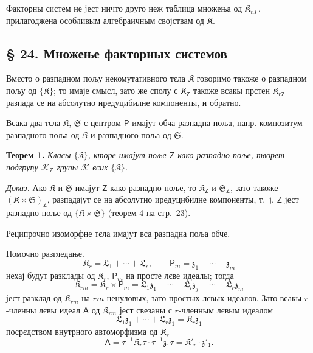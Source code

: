 \documentclass[11pt]{article}
\begin{document}
Факторны систем не јест ничто друго неж таблица множења од \(\mathfrak K_{n\Gamma}\), прилагоджена особливым алгебраичным својствам од \(\mathfrak K\).

\subsection*{§ 24. Множење факторных системов}\label{multiplikation-von-faktorensystemen}

Вмєсто о разпадном пољу некомутативного тєла \(\mathfrak K\) говоримо такоже о разпадном пољу од \(\{\mathfrak K\}\); то имаје смысл, зато же сполу с \(\mathfrak K_{\mathsf{Z}}\) такоже всакы прстен \(\mathfrak K_{r\mathsf{Z}}\) разпада се на абсолутно иредуцибилне компоненты, и обратно.

Всака два тєла \(\mathfrak K\), \(\mathfrak S\) с центром \(\mathsf P\) имајут обча разпадна поља, напр. композитум разпадного поља од \(\mathfrak K\) и разпадного поља од \(\mathfrak S\).

\textbf{Теорем 1.} \emph{Класы \(\{\mathfrak K\}\), кторе имајут поље \(\mathsf{Z}\) како разпадно поље, творет подгрупу \(\mathscr K_{\mathsf{Z}}\) групы \(\mathscr K\) всих \(\{\mathfrak K\}\).}

\emph{Доказ.} Ако \(\mathfrak K\) и \(\mathfrak S\) имајут \(\mathsf{Z}\) како разпадно поље, то \(\mathfrak K_{\mathsf{Z}}\) и \(\mathfrak S_{\mathsf{Z}}\), зато такоже \((\mathfrak K\times\mathfrak S)_{\mathsf{Z}}\), разпадајут се на абсолутно иредуцибилне компоненты, т.~ј. \(\mathsf{Z}\) јест разпадно поље од \(\{\mathfrak K\times\mathfrak S\}\) (теорем 4 на стр.~23).

Реципрочно изоморфне тєла имајут вса разпадна поља обче.

Помочно разгледање.
\[
\mathfrak K_r=\mathfrak L_1+\cdots+\mathfrak L_r,\qquad
\mathsf P_m=\mathfrak z_1+\cdots+\mathfrak z_m
\]
нехај будут разклады од \(\mathfrak K_r\), \(\mathsf P_m\) на просте лєве идеалы; тогда
\[
\mathfrak K_{rm}=\mathfrak K_r\times\mathsf P_m
=\mathfrak L_1\mathfrak z_1+\cdots+\mathfrak L_i\mathfrak z_j+\cdots+\mathfrak L_r\mathfrak z_m
\]
јест разклад од \(\mathfrak K_{rm}\) на \(rm\) ненуловых, зато простых лєвых идеалов. Зато всакы \(r\)-членны лєвы идеал \(\mathsf{A}\) од \(\mathfrak K_{rm}\) јест свезаны с \(r\)-членным лєвым идеалом
\[
\mathfrak L_1\mathfrak z_1+\cdots+\mathfrak L_r\mathfrak z_1=\mathfrak K_r\mathfrak z_1
\]
посрєдством внутрного автоморфизма од \(\mathfrak K_r\)
\[
\mathsf{A}=\tau^{-1}\mathfrak K_r\tau\cdot\tau^{-1}\mathfrak z_1\tau
=\mathfrak K'_r\cdot\mathfrak z'_1.
\]
\end{document}
